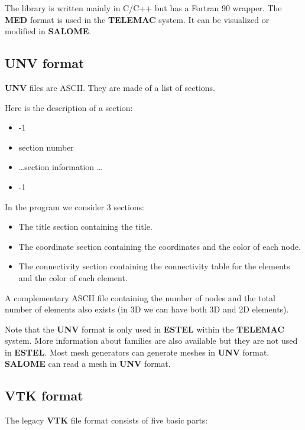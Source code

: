 \documentclass[a4paper,10pt]{article}
\newcommand{\tel}{\textbf{TELEMAC}\xspace}
\newcommand{\estel}{\textbf{ESTEL}\xspace}
\newcommand{\sal}{\textbf{SALOME}\xspace}
\newcommand{\unv}{\textbf{UNV}\xspace}
\newcommand{\med}{\textbf{MED}\xspace}
\newcommand{\vtk}{\textbf{VTK}\xspace}
\begin{document}
The library is written mainly in C/C++ but has a Fortran 90 wrapper.
The \med format is used in the \tel system. It can be visualized or modified in \sal.

\subsection{\unv format\cite{unv}}

\unv files are ASCII. They are made of a list of sections.

Here is the description of a section:

\begin{itemize}
\setlength{\itemsep}{1pt}
\setlength{\parskip}{0pt}
\setlength{\parsep}{0pt}
\item -1
\item section number
\item \ldots section information \ldots
\item -1
\end{itemize}
In the program we consider 3 sections:
\begin{itemize}
\setlength{\itemsep}{1pt}
\setlength{\parskip}{0pt}
\setlength{\parsep}{0pt}
\item The title section containing the title.
\item The coordinate section containing the coordinates and the color of each node.
\item The connectivity section containing the connectivity table for the elements and the color of each element.
\end{itemize}

A complementary ASCII file containing the number of nodes and the total number 
of elements also exists (in 3D we can have both 3D and 2D elements). 

Note that the \unv format is only used in \estel within the \tel system.
More information about families are also available but they are not used in \estel.
Most mesh generators can generate meshes in \unv format.
\sal can read a mesh in \unv format.

\subsection{\vtk format\cite{vtk}}

The legacy \vtk file format consists of five basic parts:
\end{document}
